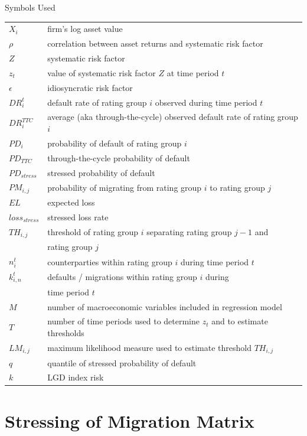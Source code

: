 \documentclass{beamer}
\begin{document}
\begin{frame}{Symbols Used}
\begin{tabular}{l l}
$X_i$ & firm's log asset value\\
$\rho$ & correlation between asset returns and systematic risk factor\\
$Z$ & systematic risk factor\\
$z_t$ & value of systematic risk factor $Z$ at time period $t$\\
$\epsilon$ & idiosyncratic risk factor\\
$DR_i^t$ & default rate of rating group $i$ observed during time period $t$\\
$DR_i^{TTC}$ & average (aka through-the-cycle) observed default rate of rating group $i$\\
$PD_i$ & probability of default of rating group $i$\\
$PD_{TTC}$ & through-the-cycle probability of default\\
$PD_{stress}$ & stressed probability of default\\
$PM_{i,j}$ & probability of migrating from rating group $i$ to rating group $j$\\
$EL$ & expected loss\\
$loss_{stress}$ & stressed loss rate\\
$TH_{i,j}$ & threshold of rating group $i$ separating rating group $j-1$ and\\
 & rating group $j$\\
$n_i^t$ & counterparties within rating group $i$ during time period $t$\\
$k_{i,n}^t$ & defaults / migrations within rating group $i$ during\\
 & time period $t$\\
$M$ & number of macroeconomic variables included in regression model\\
$T$ & number of time periods used to determine $z_t$ and to estimate thresholds\\
$LM_{i,j}$ & maximum likelihood measure used to estimate threshold $TH_{i, j}$\\
$q$ & quantile of stressed probability of default\\
$k$ & LGD index risk\\
\end{tabular}
\end{frame}

\section{Stressing of Migration Matrix}
\end{document}
